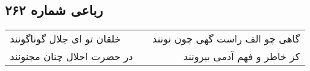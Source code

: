 \begin{center}
\section*{رباعی شماره ۲۶۲}
\label{sec:sh262}
\begin{longtable}{l p{0.5cm} r}
خلقان تو ای جلال گوناگونند
&&
گاهی چو الف راست گهی چون نونند
\\
در حضرت اجلال چنان مجنونند
&&
کز خاطر و فهم آدمی بیرونند
\\
\end{longtable}
\end{center}
